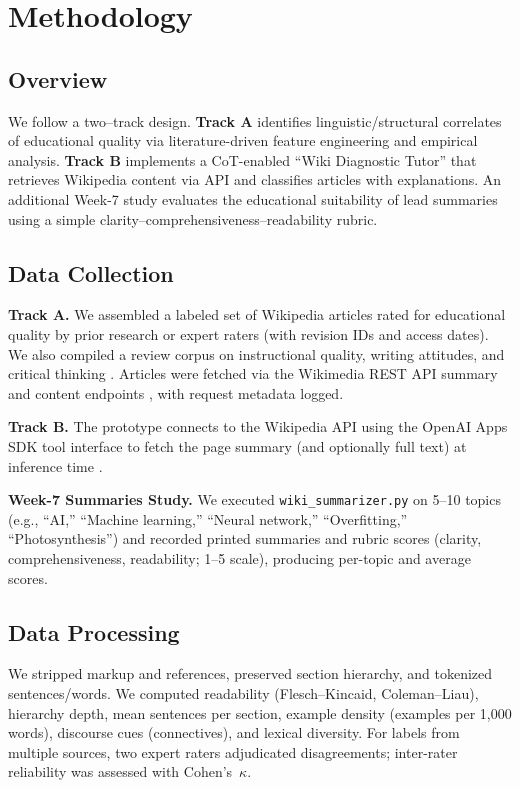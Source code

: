 
\section{Methodology}
\label{sec:methodology}

\subsection*{Overview}
We follow a two–track design. \textbf{Track A} identifies linguistic/structural correlates of educational quality via literature-driven feature engineering and empirical analysis. \textbf{Track B} implements a CoT-enabled “Wiki Diagnostic Tutor” that retrieves Wikipedia content via API and classifies articles with explanations. An additional Week-7 study evaluates the educational suitability of lead summaries using a simple clarity–comprehensiveness–readability rubric.

\subsection{Data Collection}
\textbf{Track A.} We assembled a labeled set of Wikipedia articles rated for educational quality by prior research or expert raters (with revision IDs and access dates). We also compiled a review corpus on instructional quality, writing attitudes, and critical thinking \cite{ekholm2018clarifying, pithers2000critical, fadhly2022efl}. Articles were fetched via the Wikimedia REST API summary and content endpoints \cite{wikimediaREST}, with request metadata logged.

\textbf{Track B.} The prototype connects to the Wikipedia API using the OpenAI Apps SDK tool interface to fetch the page summary (and optionally full text) at inference time \cite{openaiAppsSDK}. 

\textbf{Week-7 Summaries Study.} We executed \texttt{wiki\_summarizer.py} on 5–10 topics (e.g., “AI,” “Machine learning,” “Neural network,” “Overfitting,” “Photosynthesis”) and recorded printed summaries and rubric scores (clarity, comprehensiveness, readability; 1–5 scale), producing per-topic and average scores.

\subsection{Data Processing}
We stripped markup and references, preserved section hierarchy, and tokenized sentences/words. We computed readability (Flesch–Kincaid, Coleman–Liau), hierarchy depth, mean sentences per section, example density (examples per 1{,}000 words), discourse cues (connectives), and lexical diversity. For labels from multiple sources, two expert raters adjudicated disagreements; inter-rater reliability was assessed with Cohen’s~$\kappa$.

